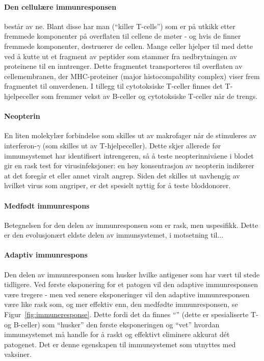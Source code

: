 \paragraph{Den cellulære immunresponsen} består av ne. Blant disse har man  (``killer T-cells'') som er på utkikk etter fremmede komponenter på overflaten til cellene de møter - og hvis de finner fremmede komponenter, destruerer de cellen. Mange celler hjelper til med dette ved å kutte ut et fragment av peptider som stammer fra nedbrytningen av proteinene til en inntrenger. Dette fragmentet transporteres til overflaten av cellemembranen, der MHC-proteiner (major histocompability complex) viser frem fragmentet til omverdenen. I tillegg til cytotoksiske T-celler finnes det T-hjelpeceller som fremmer vekst av B-celler og cytotoksiske T-celler når de trengs.

\paragraph{Neopterin} En liten molekylær forbindelse som skilles ut av makrofager når de stimuleres av interferon-$\gamma$ (som skilles ut av T-hjelpeceller). Dette skjer allerede før immunsystemet har identifisert intrengeren, så å teste neopterinnivåene i blodet gir en rask test for virusinfeksjoner: en høy konsentrasjon av neopterin indikerer at det foregår et eller annet viralt angrep. Siden det skilles ut uavhengig av hvilket virus som angriper, er det spesielt nyttig for å teste bloddonorer.

\paragraph{Medfødt immunrespons} Betegnelsen for den delen av immunresponsen som er rask, men uspesifikk. Dette er den evolusjonært eldste delen av immunsystemet, i motsetning til...

\paragraph{Adaptiv immunrespons} Den delen av immunresponsen som husker hvilke antigener som har vært til stede tidligere. Ved første eksponering for et patogen vil den adaptive immunresponsen være tregere - men ved senere eksponeringer vil den adaptive immunresponsen være like rask som, og mer effektiv enn, den medfødte immunresponsen, se Figur~\ref{fig:immuneresponse}. Dette fordi det da finnes ``'' (dette er spesialiserte T- og B-celler) som ``husker'' den første eksponeringen og ``vet'' hvordan immunsystemet må handle for å raskt og effektivt eliminere akkurat dét patogenet. Det er denne egenskapen til immunsystemet som utnyttes med vaksiner.

